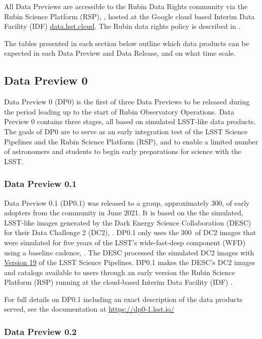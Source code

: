 All Data Previews are accessible to the Rubin Data Rights community via the Rubin Science Platform (RSP), \citep{LSE-319}, hosted at the Google cloud based Interim Data Facility (IDF) \url{data.lsst.cloud}.
The Rubin data rights policy is described in  \cite{RDO-013}.

The tables presented in each section below outline which data products can be expected in each Data Preview and Data Release, and on what time scale.

\subsection{Data Preview 0}

Data Preview 0 (DP0) is the first of three Data Previews to be released during the period leading up to the start of Rubin Observatory Operations. 
Data Preview 0 contains three stages, all based on simulated LSST-like data products. 
The goals of DP0 are to serve as an early integration test of the LSST Science Pipelines and the Rubin Science Platform (RSP), and to enable a limited number of astronomers and students to begin early preparations for science with the LSST.

\subsubsection{Data Preview 0.1}

Data Preview 0.1 (DP0.1) was released to a group, approximately 300,  of early adopters from the community in June 2021. 
It is based on the the simulated, LSST-like images generated by the Dark Energy Science Collaboration (DESC) for their Data Challenge 2 (DC2), \citep{2021ApJS..253...31L}. 
DP0.1 only uses the 300~\sqdeg of DC2 images that were simulated for five years of the LSST’s wide-fast-deep component (WFD) using a baseline cadence, .
The DESC processed the simulated DC2 images with \href{https://pipelines.lsst.io/v/v19_0_0/index.html}{Version 19} of the LSST Science Pipelines. 
DP0.1 makes the DESC’s DC2 images and catalogs available to users through an early version the Rubin Science Platform (RSP) running at the cloud-based Interim Data Facility (IDF) . 

For full details on DP0.1 including an exact description of the data products served, see the documentation at \url{https://dp0-1.lsst.io/}

\subsubsection{Data Preview 0.2}

